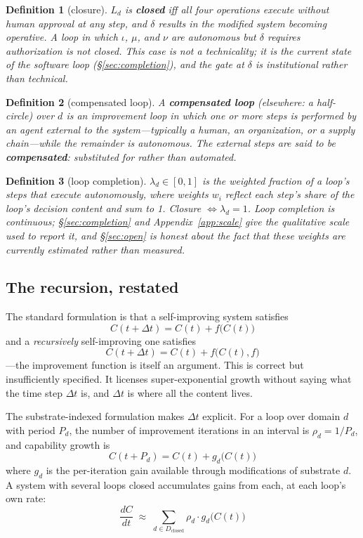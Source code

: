 \documentclass[11pt]{article}
\newtheorem{definition}{Definition}
\begin{document}
\begin{definition}[closure]
$L_d$ is \textbf{closed} iff all four operations execute without human approval at any step, and $\delta$ results in the modified system becoming operative. A loop in which $\iota$, $\mu$, and $\nu$ are autonomous but $\delta$ requires authorization is \emph{not} closed. This case is not a technicality; it is the current state of the software loop (\S\ref{sec:completion}), and the gate at $\delta$ is institutional rather than technical.
\end{definition}

\begin{definition}[compensated loop]
A \textbf{compensated loop} (elsewhere: a \emph{half-circle}) over $d$ is an improvement loop in which one or more steps is performed by an agent external to the system---typically a human, an organization, or a supply chain---while the remainder is autonomous. The external steps are said to be \textbf{compensated}: substituted for rather than automated.
\end{definition}

\begin{definition}[loop completion]
$\lambda_d \in [0,1]$ is the weighted fraction of a loop's steps that execute autonomously, where weights $w_i$ reflect each step's share of the loop's decision content and sum to 1. Closure $\iff \lambda_d = 1$. Loop completion is continuous; \S\ref{sec:completion} and Appendix~\ref{app:scale} give the qualitative scale used to report it, and \S\ref{sec:open} is honest about the fact that these weights are currently estimated rather than measured.
\end{definition}

\subsection{The recursion, restated}

The standard formulation is that a self-improving system satisfies
\[
C(t + \Delta t) = C(t) + f\big(C(t)\big)
\]
and a \emph{recursively} self-improving one satisfies
\[
C(t + \Delta t) = C(t) + f\big(C(t), f\big)
\]
---the improvement function is itself an argument. This is correct but insufficiently specified. It licenses super-exponential growth without saying what the time step $\Delta t$ is, and $\Delta t$ is where all the content lives.

The substrate-indexed formulation makes $\Delta t$ explicit. For a loop over domain $d$ with period $P_d$, the number of improvement iterations in an interval is $\rho_d = 1/P_d$, and capability growth is
\[
C(t + P_d) = C(t) + g_d\big(C(t)\big)
\]
where $g_d$ is the per-iteration gain available through modifications of substrate $d$. A system with several loops closed accumulates gains from each, at each loop's own rate:
\begin{equation}
\frac{dC}{dt} \;\approx\; \sum_{d \in D_{\mathrm{closed}}} \rho_d \cdot g_d\big(C(t)\big)
\label{eq:schema}
\end{equation}
\end{document}
